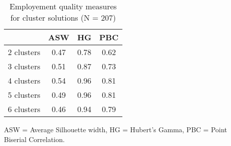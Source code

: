 \begin{table}[htp]
\footnotesize
\setlength{\tabcolsep}{35pt}
\renewcommand{\arraystretch}{1.3}
\begin{threeparttable}
\centering
\caption{Employement quality measures for cluster solutions (N = 207)} 
\label{tab:quality_clusters_job}
\begin{tabular}{lccc}
  \hline
 & ASW & HG & PBC \\ 
  \hline
2 clusters & 0.47 & 0.78 & 0.62 \\ 
  3 clusters & 0.51 & 0.87 & 0.73 \\ 
  4 clusters & 0.54 & 0.96 & 0.81 \\ 
  5 clusters & 0.49 & 0.96 & 0.81 \\ 
  6 clusters & 0.46 & 0.94 & 0.79 \\ 
   \hline
\end{tabular}
\begin{tablenotes}
\scriptsize
\item ASW = Average Silhouette width, HG = Hubert's Gamma, PBC = Point Biserial Correlation.
\end{tablenotes}
\end{threeparttable}
\end{table}
